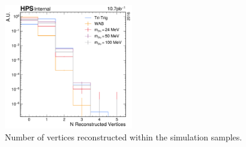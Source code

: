 \begin{figure}
  \centering
  \includegraphics[width=0.5\textwidth]{figures/hps/dataset/n-vertex-pre-selection-mc-only.pdf}
  \caption{Number of vertices reconstructed within the simulation samples.}
  \label{fig:n-vertex-pre-selection}
\end{figure}
